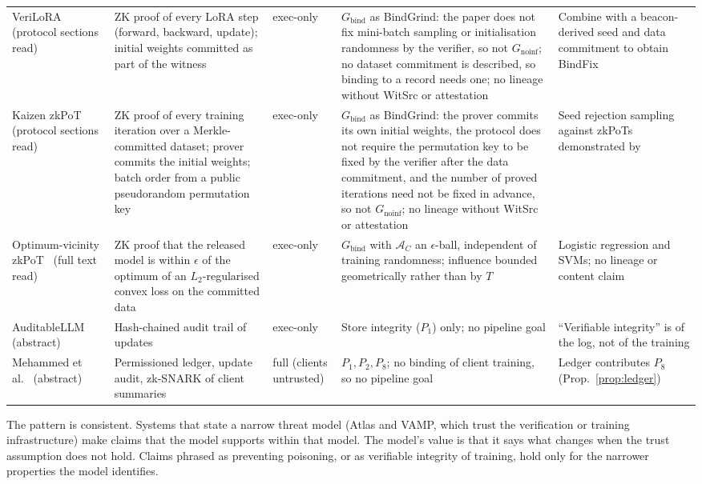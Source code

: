 \begin{table}[t]
\begin{tabular}{@{}p{2.3cm}p{3.6cm}p{2.1cm}p{4.6cm}p{3.6cm}@{}}
VeriLoRA~\cite{liao2026verilora} (protocol sections read) & ZK proof of every LoRA step (forward, backward, update); initial weights committed as part of the witness & exec-only & $G_{\mathrm{bind}}$ as \textsf{BindGrind}: the paper does not fix mini-batch sampling or initialisation randomness by the verifier, so not $G_{\mathrm{noinf}}$; no dataset commitment is described, so binding to a record needs one; no lineage without WitSrc or attestation & Combine with a beacon-derived seed and data commitment to obtain \textsf{BindFix}\\
Kaizen zkPoT~\cite{abbaszadeh2024zkpot} (protocol sections read) & ZK proof of every training iteration over a Merkle-committed dataset; prover commits the initial weights; batch order from a public pseudorandom permutation key & exec-only & $G_{\mathrm{bind}}$ as \textsf{BindGrind}: the prover commits its own initial weights, the protocol does not require the permutation key to be fixed by the verifier after the data commitment, and the number of proved iterations need not be fixed in advance, so not $G_{\mathrm{noinf}}$; no lineage without WitSrc or attestation & Seed rejection sampling against zkPoTs demonstrated by~\cite{tan2025zkpot}\\
Optimum-vicinity zkPoT~\cite{tan2025zkpot} (full text read) & ZK proof that the released model is within $\epsilon$ of the optimum of an $L_2$-regularised convex loss on the committed data & exec-only & $G_{\mathrm{bind}}$ with $\mathcal A_C$ an $\epsilon$-ball, independent of training randomness; influence bounded geometrically rather than by $T$ & Logistic regression and SVMs; no lineage or content claim\\
AuditableLLM~\cite{li2025auditablellm} (abstract) & Hash-chained audit trail of updates & exec-only & Store integrity ($P_1$) only; no pipeline goal & ``Verifiable integrity'' is of the log, not of the training\\
Mehammed et al.~\cite{mehammed2025fl} (abstract) & Permissioned ledger, update audit, zk-SNARK of client summaries & full (clients untrusted) & $P_1,P_2,P_8$; no binding of client training, so no pipeline goal & Ledger contributes $P_8$ (Prop.~\ref{prop:ledger})\\
\bottomrule
\end{tabular}
\end{table}

The pattern is consistent. Systems that state a narrow threat model (Atlas and VAMP, which
trust the verification or training infrastructure) make claims that the model supports
within that model. The model's value is that it says what changes when the trust assumption
does not hold. Claims phrased as preventing poisoning, or as verifiable integrity of
training, hold only for the narrower properties the model identifies.

